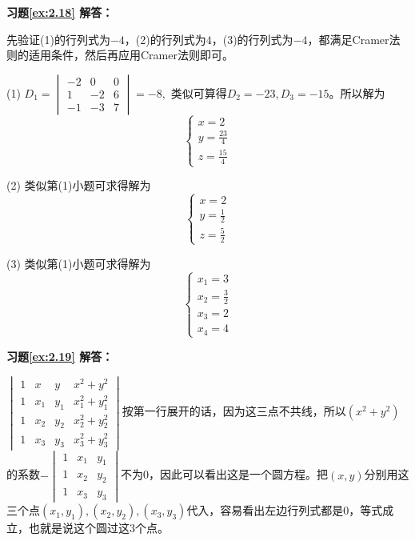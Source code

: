 \documentclass[a4paper]{book}
\newcommand{\enum}{\begin{list}{}{\setlength{\leftmargin}{0pt} \setlength{\itemindent}{2.5em} \setlength{\listparindent}{2em}}}
\begin{document}
\vspace{1.5em}

\textbf{习题\ref{ex:2.18} 解答：}

先验证(1)的行列式为$-4$，(2)的行列式为$4$，(3)的行列式为$-4$，都满足Cramer法则的适用条件，然后再应用Cramer法则即可。

\enum
\item[(1)] $D_1 = \begin{vmatrix} -2 & 0 & 0 \\ 1 & -2 & 6 \\ -1 & -3 & 7 \end{vmatrix} = -8,$ 类似可算得$D_2 = -23, D_3 = -15$。所以解为
$$\begin{cases} x=2 \\ y=\frac{23}{4} \\ z=\frac{15}{4} \end{cases}$$
\item[(2)] 类似第(1)小题可求得解为
$$\begin{cases} x=2 \\ y=\frac12 \\ z=\frac52 \end{cases}$$
\item[(3)] 类似第(1)小题可求得解为
$$\begin{cases} x_1=3 \\ x_2=\frac32 \\ x_3=2 \\ x_4=4 \end{cases}$$
\end{list}

\vspace{1.5em}

\textbf{习题\ref{ex:2.19} 解答：}

$\begin{vmatrix} 1 & x & y & x^2 + y^2 \\ 1 & x_1 & y_1 & x_1^2 + y_1^2 \\ 1 & x_2 & y_2 & x_2^2 + y_2^2 \\ 1 & x_3 & y_3 & x_3^2 + y_3^2 \end{vmatrix}$按第一行展开的话，因为这三点不共线，所以$(x^2+y^2)$的系数$-\begin{vmatrix} 1 & x_1 & y_1 \\ 1 & x_2 & y_2 \\ 1 & x_3 & y_3 \end{vmatrix}$不为0，因此可以看出这是一个圆方程。把$(x, y)$分别用这三个点$(x_1, y_1), (x_2, y_2), (x_3, y_3)$代入，容易看出左边行列式都是0，等式成立，也就是说这个圆过这3个点。
\end{document}
